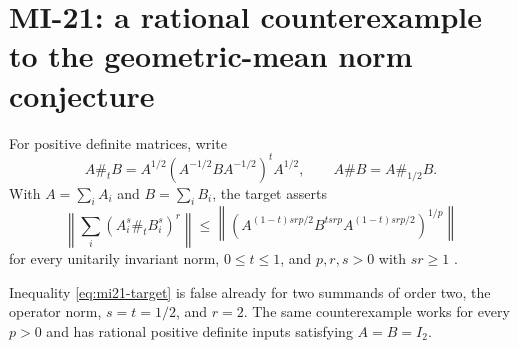 \section{MI-21: a rational counterexample to the geometric-mean norm conjecture}
\label{sec:mi21}

For positive definite matrices, write
\[
 A\#_tB=A^{1/2}(A^{-1/2}BA^{-1/2})^tA^{1/2},\qquad A\#B=A\#_{1/2}B.
\]
With $A=\sum_iA_i$ and $B=\sum_iB_i$, the target asserts
\begin{equation}\label{eq:mi21-target}
 \left\|\sum_i(A_i^s\#_tB_i^s)^r\right\|
 \leq
 \left\|\left(A^{(1-t)srp/2}B^{tsrp}A^{(1-t)srp/2}\right)^{1/p}\right\|
\end{equation}
for every unitarily invariant norm, $0\leq t\leq1$, and $p,r,s>0$ with $sr\geq1$ \cite[Conjecture 3]{FH2024}.

\begin{theorem}\label{thm:mi21}
Inequality \eqref{eq:mi21-target} is false already for two summands of order two, the operator norm, $s=t=1/2$, and $r=2$. The same counterexample works for every $p>0$ and has rational positive definite inputs satisfying $A=B=I_2$.
\end{theorem}

